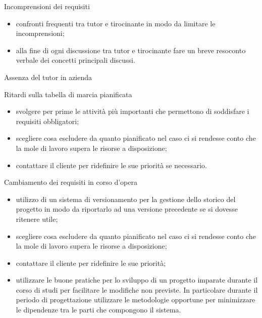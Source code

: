 \begin{risk}{Incomprensioni dei requisiti}
    \begin{itemize}
        \item confronti frequenti tra tutor e tirocinante in modo da limitare le incomprensioni;
        \item alla fine di ogni discussione tra tutor e tirocinante fare un breve resoconto verbale dei concetti principali discussi.
    \end{itemize}
    \label{risk:incomprensioni-dei-requisiti} 
\end{risk}
\begin{risk}{Assenza del tutor in azienda}
    \label{risk:assenza-del-tutor-in-azienda} 
\end{risk}
\begin{risk}{Ritardi sulla tabella di marcia pianificata}
    \begin{itemize}
        \item svolgere per prime le attività più importanti che permettono di soddisfare i requisiti obbligatori;
        \item scegliere cosa escludere da quanto pianificato nel caso ci si rendesse conto che la mole di lavoro supera le risorse a disposizione;
        \item contattare il cliente per ridefinire le sue priorità se necessario.
    \end{itemize}
    \label{risk:ritardi-sulla-tabella-di-marcia-pianificata} 
\end{risk}
\begin{risk}{Cambiamento dei requisiti in corso d'opera}
    \begin{itemize}
        \item utilizzo di un sistema di versionamento per la gestione dello storico del progetto in modo da riportarlo ad una versione precedente se si dovesse ritenere utile;
        \item scegliere cosa escludere da quanto pianificato nel caso ci si rendesse conto che la mole di lavoro supera le risorse a disposizione;
        \item contattare il cliente per ridefinire le sue priorità;
        \item utilizzare le buone pratiche per lo sviluppo di un progetto imparate durante il corso di studi per facilitare le modifiche non previste. In particolare durante il periodo di 
        progettazione utilizzare le metodologie opportune per minimizzare le dipendenze tra le parti che compongono il sistema.
    \end{itemize}
    \label{risk:cambiamento-dei-requisiti-in-corso-opera} 
\end{risk}

